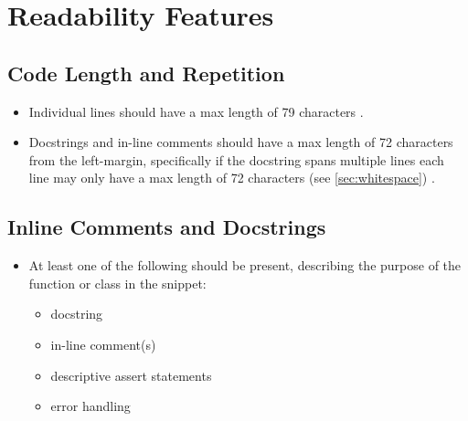 \documentclass[11pt]{article}
\begin{document}
\newpage

\section{Readability Features}

\subsection{Code Length and Repetition}

\begin{itemize}

    \item Individual lines should have a max length of 79 characters \cite{pep8_max_line_length}.

    \item Docstrings and in-line comments should have a max length of 72 characters from the left-margin, specifically if the docstring spans multiple lines each line may only have a max length of 72 characters (see \autoref{sec:whitespace}) \cite{pep8_max_line_length}.
    
\end{itemize}

\subsection{Inline Comments and Docstrings}

\begin{itemize}

    \item At least one of the following should be present, describing the purpose of the function or class in the snippet:

    \vspace{-2.5mm}
    
    \begin{itemize}[label=\textopenbullet]

        \item docstring \cite{pep257_docstring_convention}
        \item in-line comment(s) \cite{pep8_inline_comments}
        \item descriptive assert statements
        \item error handling
        
    \end{itemize}
    
\end{itemize}
\end{document}
